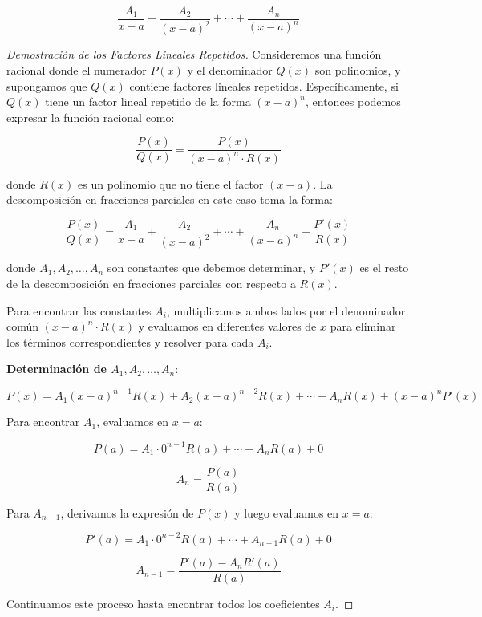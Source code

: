 \[
\frac{A_1}{x - a} + \frac{A_2}{(x - a)^2} + \cdots + \frac{A_n}{(x - a)^n}
\]
\begin{proof}[Demostración de los Factores Lineales Repetidos]
    Consideremos una función racional donde el numerador \( P(x) \) y el denominador \( Q(x) \) son polinomios, y supongamos que \( Q(x) \) contiene factores lineales repetidos. Específicamente, si \( Q(x) \) tiene un factor lineal repetido de la forma \( (x - a)^n \), entonces podemos expresar la función racional como:

\[
\frac{P(x)}{Q(x)} = \frac{P(x)}{(x - a)^n \cdot R(x)}
\]

donde \( R(x) \) es un polinomio que no tiene el factor \( (x - a) \). La descomposición en fracciones parciales en este caso toma la forma:

\[
\frac{P(x)}{Q(x)} = \frac{A_1}{x - a} + \frac{A_2}{(x - a)^2} + \cdots + \frac{A_n}{(x - a)^n} + \frac{P'(x)}{R(x)}
\]

donde \( A_1, A_2, \ldots, A_n \) son constantes que debemos determinar, y \( P'(x) \) es el resto de la descomposición en fracciones parciales con respecto a \( R(x) \).

Para encontrar las constantes \( A_i \), multiplicamos ambos lados por el denominador común \( (x - a)^n \cdot R(x) \) y evaluamos en diferentes valores de \( x \) para eliminar los términos correspondientes y resolver para cada \( A_i \).

\textbf{Determinación de \( A_1, A_2, \ldots, A_n \)}:

\[
P(x) = A_1(x - a)^{n-1}R(x) + A_2(x - a)^{n-2}R(x) + \cdots + A_nR(x) + (x - a)^nP'(x)
\]

Para encontrar \( A_1 \), evaluamos en \( x = a \):

\[
P(a) = A_1 \cdot 0^{n-1}R(a) + \cdots + A_nR(a) + 0
\]

\[
A_n = \frac{P(a)}{R(a)}
\]

Para \( A_{n-1} \), derivamos la expresión de \( P(x) \) y luego evaluamos en \( x = a \):

\[
P'(a) = A_1 \cdot 0^{n-2}R(a) + \cdots + A_{n-1}R(a) + 0
\]

\[
A_{n-1} = \frac{P'(a) - A_nR'(a)}{R(a)}
\]

Continuamos este proceso hasta encontrar todos los coeficientes \( A_i \).

\end{proof}
